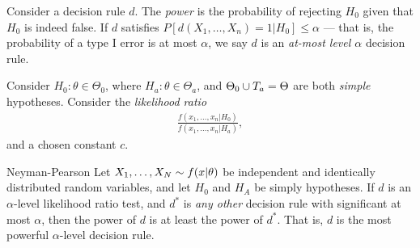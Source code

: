 \begin{defn}
    Consider a decision rule $d$. The \emph{power} is the probability of rejecting $H_0$ given that $H_0$ is indeed false. If $d$ satisfies $P\left[d(X_1, \ldots, X_n)=1|H_0\right] \leq \alpha$ --- that is, the probability of a type I error is at most $\alpha$, we say $d$ is an \emph{at-most level $\alpha$} decision rule.
\end{defn}

\begin{exmp}
    Consider $H_0: \theta \in \Theta_0$, where $H_a: \theta \in \Theta_a$, and $\Theta_0 \cup T_a = \Theta$ are both \emph{simple} hypotheses. Consider the \emph{likelihood ratio}
    \begin{align*}
        \frac{f(x_1, \ldots, x_n|H_0)}{f(x_1, \ldots, x_n|H_a)},
    \end{align*}
    and a chosen constant $c$.
\end{exmp}

\begin{lemma}{Neyman-Pearson}\label{neyman-pearson}\proofbreak
    Let $X_1, \ldots, X_N \sim f(x|\theta)$ be independent and identically distributed random variables, and let $H_0$ and $H_A$ be simply hypotheses. If $d$ is an $\alpha$-level likelihood ratio test, and $d^{*}$ is \emph{any other} decision rule with significant at most $\alpha$, then the power of $d$ is at least the power of $d^{*}$. That is, $d$ is the most powerful $\alpha$-level decision rule.
\end{lemma}

